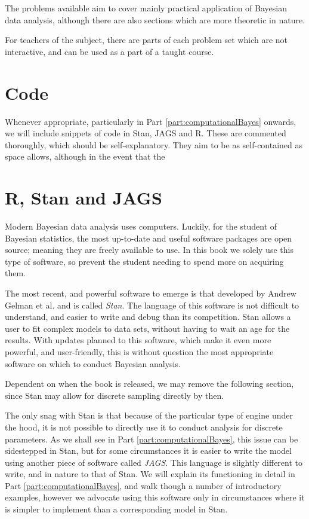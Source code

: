 \documentclass[11pt,fullpage]{book}
\begin{document}
The problems available aim to cover mainly practical application of Bayesian data analysis, although there are also sections which are more theoretic in nature.

For teachers of the subject, there are parts of each problem set which are not interactive, and can be used as a part of a taught course.

\section{Code}
Whenever appropriate, particularly in Part \ref{part:computationalBayes} onwards, we will include snippets of code in Stan, JAGS and R. These are commented thoroughly, which should be self-explanatory. They aim to be as self-contained as space allows, although in the event that the 

\section{R, Stan and JAGS}
Modern Bayesian data analysis uses computers. Luckily, for the student of Bayesian statistics, the most up-to-date and useful software packages are open source; meaning they are freely available to use. In this book we solely use this type of software, so prevent the student needing to spend more on acquiring them.

The most recent, and powerful software to emerge is that developed by Andrew Gelman et al.\cite{stan-software:2014} and is called \textit{Stan}. The language of this software is not difficult to understand, and easier to write and debug than its competition. Stan allows a user to fit complex models to data sets, without having to wait an age for the results. With updates planned to this software, which make it even more powerful, and user-friendly, this is without question the most appropriate software on which to conduct Bayesian analysis.

Dependent on when the book is released, we may remove the following section, since Stan may allow for discrete sampling directly by then.

The only snag with Stan is that because of the particular type of engine under the hood, it is not possible to directly use it to conduct analysis for discrete parameters. As we shall see in Part \ref{part:computationalBayes}, this issue can be sidestepped in Stan, but for some circumstances it is easier to write the model using another piece of software called \textit{JAGS}\cite{plummer2003jags}. This language is slightly different to write, and in nature to that of Stan. We will explain its functioning in detail in Part \ref{part:computationalBayes}, and walk though a number of introductory examples, however we advocate using this software only in circumstances where it is simpler to implement than a corresponding model in Stan.
\end{document}
